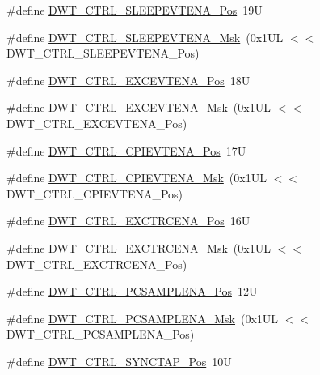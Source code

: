 \begin{DoxyCompactItemize}
\item 
\#define \hyperlink{group___c_m_s_i_s___d_w_t_ga9c6d62d121164013a8e3ee372f17f3e5}{D\+W\+T\+\_\+\+C\+T\+R\+L\+\_\+\+S\+L\+E\+E\+P\+E\+V\+T\+E\+N\+A\+\_\+\+Pos}~19U
\item 
\#define \hyperlink{group___c_m_s_i_s___d_w_t_ga2f431b3734fb840daf5b361034856da9}{D\+W\+T\+\_\+\+C\+T\+R\+L\+\_\+\+S\+L\+E\+E\+P\+E\+V\+T\+E\+N\+A\+\_\+\+Msk}~(0x1\+U\+L $<$$<$ D\+W\+T\+\_\+\+C\+T\+R\+L\+\_\+\+S\+L\+E\+E\+P\+E\+V\+T\+E\+N\+A\+\_\+\+Pos)
\item 
\#define \hyperlink{group___c_m_s_i_s___d_w_t_gaf4e73f548ae3e945ef8b1d9ff1281544}{D\+W\+T\+\_\+\+C\+T\+R\+L\+\_\+\+E\+X\+C\+E\+V\+T\+E\+N\+A\+\_\+\+Pos}~18U
\item 
\#define \hyperlink{group___c_m_s_i_s___d_w_t_gab7ee0def33423b5859ca4030dff63b58}{D\+W\+T\+\_\+\+C\+T\+R\+L\+\_\+\+E\+X\+C\+E\+V\+T\+E\+N\+A\+\_\+\+Msk}~(0x1\+U\+L $<$$<$ D\+W\+T\+\_\+\+C\+T\+R\+L\+\_\+\+E\+X\+C\+E\+V\+T\+E\+N\+A\+\_\+\+Pos)
\item 
\#define \hyperlink{group___c_m_s_i_s___d_w_t_ga9fff0b71fb0be1499f5180c6bce1fc8f}{D\+W\+T\+\_\+\+C\+T\+R\+L\+\_\+\+C\+P\+I\+E\+V\+T\+E\+N\+A\+\_\+\+Pos}~17U
\item 
\#define \hyperlink{group___c_m_s_i_s___d_w_t_ga189089c30aade60b983df17ad2412f6f}{D\+W\+T\+\_\+\+C\+T\+R\+L\+\_\+\+C\+P\+I\+E\+V\+T\+E\+N\+A\+\_\+\+Msk}~(0x1\+U\+L $<$$<$ D\+W\+T\+\_\+\+C\+T\+R\+L\+\_\+\+C\+P\+I\+E\+V\+T\+E\+N\+A\+\_\+\+Pos)
\item 
\#define \hyperlink{group___c_m_s_i_s___d_w_t_ga05f13b547a9a1e63e003ee0bc6446d0d}{D\+W\+T\+\_\+\+C\+T\+R\+L\+\_\+\+E\+X\+C\+T\+R\+C\+E\+N\+A\+\_\+\+Pos}~16U
\item 
\#define \hyperlink{group___c_m_s_i_s___d_w_t_gaf4fbb509ab3cbb768f16484c660a24c3}{D\+W\+T\+\_\+\+C\+T\+R\+L\+\_\+\+E\+X\+C\+T\+R\+C\+E\+N\+A\+\_\+\+Msk}~(0x1\+U\+L $<$$<$ D\+W\+T\+\_\+\+C\+T\+R\+L\+\_\+\+E\+X\+C\+T\+R\+C\+E\+N\+A\+\_\+\+Pos)
\item 
\#define \hyperlink{group___c_m_s_i_s___d_w_t_ga1e14afc7790fcb424fcf619e192554c9}{D\+W\+T\+\_\+\+C\+T\+R\+L\+\_\+\+P\+C\+S\+A\+M\+P\+L\+E\+N\+A\+\_\+\+Pos}~12U
\item 
\#define \hyperlink{group___c_m_s_i_s___d_w_t_gafdcf1c86f43fbeaf2780ce797c9ef3d6}{D\+W\+T\+\_\+\+C\+T\+R\+L\+\_\+\+P\+C\+S\+A\+M\+P\+L\+E\+N\+A\+\_\+\+Msk}~(0x1\+U\+L $<$$<$ D\+W\+T\+\_\+\+C\+T\+R\+L\+\_\+\+P\+C\+S\+A\+M\+P\+L\+E\+N\+A\+\_\+\+Pos)
\item 
\#define \hyperlink{group___c_m_s_i_s___d_w_t_ga678ef08786edcbef964479217efb9284}{D\+W\+T\+\_\+\+C\+T\+R\+L\+\_\+\+S\+Y\+N\+C\+T\+A\+P\+\_\+\+Pos}~10U
$$
\end{DoxyCompactItemize}
